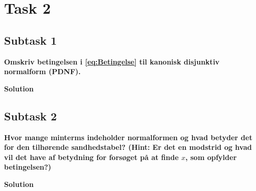 \section{Task 2}
\subsection{Subtask 1}
\noindent
\textbf{Omskriv betingelsen i \eqref{eq:Betingelse} til kanonisk disjunktiv normalform (PDNF). }

\bigskip
\noindent
\textbf{Solution}

\subsection{Subtask 2}
\noindent
\textbf{Hvor mange minterms indeholder normalformen og hvad betyder det for den tilhørende sandhedstabel? (Hint: Er det en modstrid og hvad vil det have af betydning for forsøget på at finde $x$, som opfylder betingelsen?)}

\bigskip
\noindent
\textbf{Solution}

